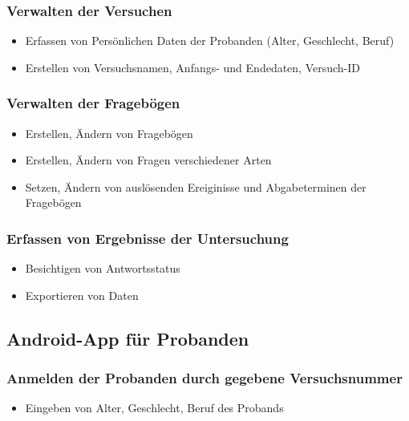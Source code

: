 \documentclass[a4paper]{scrreprt}
\begin{document}
                \subsubsection{Verwalten der Versuchen}
                    \begin{itemize}
                        \item Erfassen von Pers\"onlichen Daten der Probanden (Alter, Geschlecht, Beruf)
                        \item Erstellen von Versuchsnamen, Anfangs- und Endedaten, Versuch-ID
                    \end{itemize}
                
                \subsubsection{Verwalten der Frageb\"ogen}
                    \begin{itemize}
                        \item Erstellen, Ändern von Fragebögen
                        \item Erstellen, \"Andern von Fragen verschiedener Arten
                        \item Setzen, \"Andern von auslösenden Ereiginisse und Abgabeterminen der Fragebögen
                    \end{itemize}

                \subsubsection{Erfassen von Ergebnisse der Untersuchung}
                    \begin{itemize}
                        \item Besichtigen von \gls{Antwortsstatus}
                        \item Exportieren von Daten
                    \end{itemize}
            \vspace*{0.5cm}

            \subsection{\gls{Android-App} f\"ur \gls{Proband}en}

                \subsubsection{Anmelden der \gls{Proband}en durch gegebene Versuchsnummer}
                    \begin{itemize}
                        \item Eingeben von Alter, Geschlecht, Beruf des Probands
                    \end{itemize}
\end{document}
